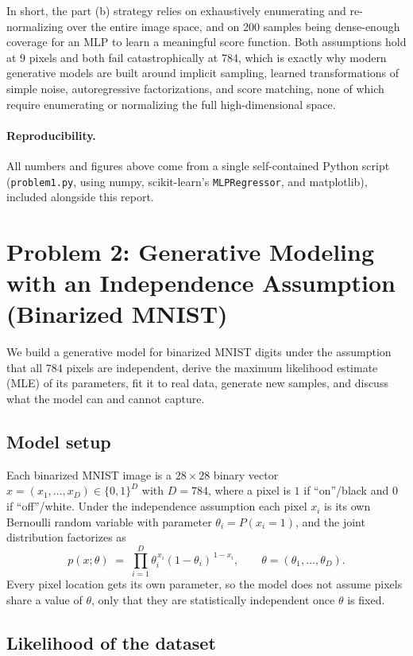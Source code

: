 \documentclass[11pt]{article}
\begin{document}
In short, the part (b) strategy relies on exhaustively enumerating and
re-normalizing over the entire image space, and on 200 samples being
dense-enough coverage for an MLP to learn a meaningful score function. Both
assumptions hold at 9 pixels and both fail catastrophically at 784, which is
exactly why modern generative models are built around implicit sampling,
learned transformations of simple noise, autoregressive factorizations, and
score matching, none of which require enumerating or normalizing the full
high-dimensional space.

\paragraph{Reproducibility.} All numbers and figures above come from a single
self-contained Python script (\texttt{problem1.py}, using numpy, scikit-learn's
\texttt{MLPRegressor}, and matplotlib), included alongside this report.
\newpage
\section{Problem 2: Generative Modeling with an Independence Assumption (Binarized MNIST)}

We build a generative model for binarized MNIST digits under the assumption
that all 784 pixels are independent, derive the maximum likelihood estimate
(MLE) of its parameters, fit it to real data, generate new samples, and discuss
what the model can and cannot capture.

\subsection*{Model setup}

Each binarized MNIST image is a $28\times 28$ binary vector
$x = (x_1, \dots, x_D) \in \{0,1\}^D$ with $D = 784$, where a pixel is $1$ if
``on''/black and $0$ if ``off''/white. Under the independence assumption each
pixel $x_i$ is its own Bernoulli random variable with parameter
$\theta_i = P(x_i = 1)$, and the joint distribution factorizes as
\[
  p(x;\theta) \;=\; \prod_{i=1}^{D} \theta_i^{\,x_i} (1-\theta_i)^{\,1-x_i},
  \qquad \theta = (\theta_1, \dots, \theta_D).
\]
Every pixel location gets its own parameter, so the model does not assume
pixels share a value of $\theta$, only that they are statistically independent
once $\theta$ is fixed.

\subsection*{Likelihood of the dataset}
\end{document}

